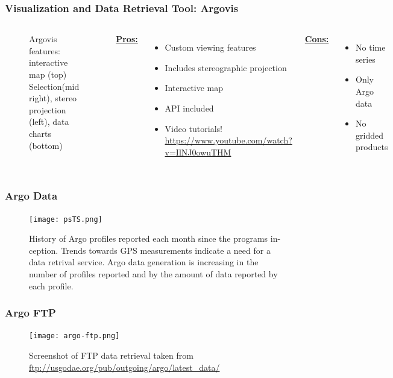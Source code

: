 \begin{frame}
\frametitle{Visualization and Data Retrieval Tool: Argovis}
\begin{columns}
\begin{figure}
\vspace*{-.6cm}
\begin{minipage}{1\columnwidth}
\centering
{}
\caption{\tiny{Argovis features: interactive map (top) Selection(mid right), stereo projection (left), data charts (bottom)}}
\end{minipage}
\end{figure}
\small{\underline{\textbf{Pros:}}}
\begin{itemize}
    \item Custom viewing features
    \item Includes stereographic projection
    \item Interactive map
    \item API included
    \item Video tutorials! \url{https://www.youtube.com/watch?v=IlNJ0owuTHM}
\end{itemize}
\small{\underline{\textbf{Cons:}}}
\begin{itemize}
    \item No time series
    \item Only Argo data
    \item No gridded products
\end{itemize}
\end{columns}
\end{frame}



\begin{frame}
\frametitle{Argo Data}
\begin{figure}
\centering
\begin{minipage}{1\columnwidth}
\texttt{[image: psTS.png]}
\caption{History of Argo profiles reported each month since the programs in-
ception. Trends towards GPS measurements indicate a need for a data retrival service. Argo data generation is increasing in the number of profiles reported and by the
amount of data reported by each profile.}
\end{minipage}
\end{figure}
\end{frame}

\begin{frame}
\frametitle{Argo FTP}
\begin{figure}
\centering
\begin{minipage}{1\columnwidth}
\texttt{[image: argo-ftp.png]}
\caption{Screenshot of FTP data retrieval taken from \url{ftp://usgodae.org/pub/outgoing/argo/latest_data/}}
\end{minipage}
\end{figure}
\end{frame}

